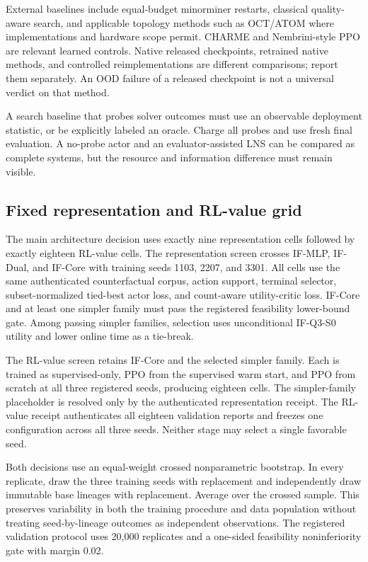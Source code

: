 External baselines include equal-budget minorminer restarts, classical quality-aware search, and applicable topology methods such as OCT/ATOM where implementations and hardware scope permit. CHARME and Nembrini-style PPO are relevant learned controls\cite{charme2024,nembrini2026}. Native released checkpoints, retrained native methods, and controlled reimplementations are different comparisons; report them separately. An OOD failure of a released checkpoint is not a universal verdict on that method.

A search baseline that probes solver outcomes must use an observable deployment statistic, or be explicitly labeled an oracle. Charge all probes and use fresh final evaluation. A no-probe actor and an evaluator-assisted LNS can be compared as complete systems, but the resource and information difference must remain visible.

\subsection{Fixed representation and RL-value grid}
The main architecture decision uses exactly nine representation cells followed by exactly eighteen RL-value cells. The representation screen crosses IF-MLP, IF-Dual, and IF-Core with training seeds 1103, 2207, and 3301. All cells use the same authenticated counterfactual corpus, action support, terminal selector, subset-normalized tied-best actor loss, and count-aware utility-critic loss. IF-Core and at least one simpler family must pass the registered feasibility lower-bound gate. Among passing simpler families, selection uses unconditional IF-Q3-S0 utility and lower online time as a tie-break.

The RL-value screen retains IF-Core and the selected simpler family. Each is trained as supervised-only, PPO from the supervised warm start, and PPO from scratch at all three registered seeds, producing eighteen cells. The simpler-family placeholder is resolved only by the authenticated representation receipt. The RL-value receipt authenticates all eighteen validation reports and freezes one configuration across all three seeds. Neither stage may select a single favorable seed.

Both decisions use an equal-weight crossed nonparametric bootstrap. In every replicate, draw the three training seeds with replacement and independently draw immutable base lineages with replacement. Average over the crossed sample. This preserves variability in both the training procedure and data population without treating seed-by-lineage outcomes as independent observations. The registered validation protocol uses 20,000 replicates and a one-sided feasibility noninferiority gate with margin 0.02.

